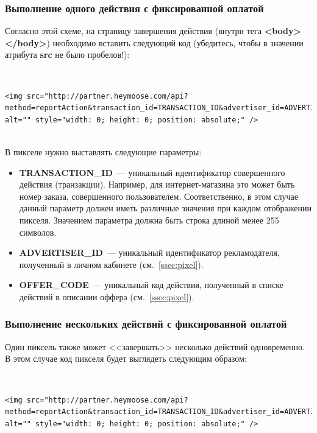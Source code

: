 \documentclass[a4paper,12pt]{article}
\begin{document}
\subsubsection{Выполнение одного действия с фиксированной оплатой}

Согласно этой схеме, на страницу завершения действия (внутри тега \textbf{<body></body>}) необходимо вставить следующий код (убедитесь, чтобы в значении атрибута \textbf{src} не было пробелов!):

~\\

\begin{lstlisting}[language=Pixel]
<img src="http://partner.heymoose.com/api?method=reportAction&transaction_id=TRANSACTION_ID&advertiser_id=ADVERTISER_ID&offer=OFFER_CODE" 
alt="" style="width: 0; height: 0; position: absolute;" />
\end{lstlisting}

~\\

В пикселе нужно выставлять следующие параметры:

\begin{itemize}
\item \textbf{TRANSACTION\_ID}~--- уникальный идентификатор совершенного действия (транзакции). Например, для интернет-магазина это может быть номер заказа, совершенного пользователем. Соответственно, в этом случае данный параметр должен иметь различные значения при каждом отображении пикселя. Значением параметра должна быть строка длиной менее 255 символов.
\item \textbf{ADVERTISER\_ID}~--- уникальный идентификатор рекламодателя, полученный в личном кабинете (см.~\ref{ssec:pixel}).
\item \textbf{OFFER\_CODE}~--- уникальный код действия, полученный в списке действий в описании оффера (см.~\ref{ssec:pixel}).
\end{itemize}

\subsubsection{Выполнение нескольких действий с фиксированной оплатой}
\label{sssec:fix-multiple}

Один пиксель также может <<завершать>> несколько действий одновременно. В этом случае код пикселя будет выглядеть следующим образом:

~\\

\begin{lstlisting}[language=Pixel]
<img src="http://partner.heymoose.com/api?method=reportAction&transaction_id=TRANSACTION_ID&advertiser_id=ADVERTISER_ID&offer=OFFER_CODE1,OFFER_CODE2,OFFER_CODE3" 
alt="" style="width: 0; height: 0; position: absolute;" />
\end{lstlisting}
\end{document}
